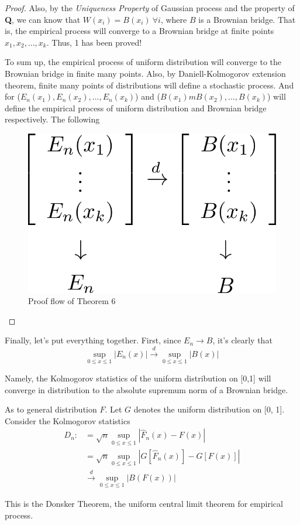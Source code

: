\documentclass[final_project_1.tex]{subfiles}
\begin{document}
\begin{proof}
Also, by the {\it Uniqueness Property} of Gaussian process and the property of {\bf Q}, we can know that $W(x_i)=B(x_i)\ \forall i$, where $B$ is a Brownian bridge. That is, the empirical process will converge to a Brownian bridge at finite points $x_1, x_2, ..., x_k$. Thus, 1 has been proved!

To sum up, the empirical process of uniform distribution will converge to the Brownian bridge in finite many points. Also, by Daniell-Kolmogorov extension theorem, finite many points of distributions will define a stochastic process. And for ($E_n(x_1), E_n(x_2), ..., E_n(x_k)$) and ($B(x_1)m B(x_2), ..., B(x_k)$) will define the empirical process of uniform distribution and Brownian bridge respectively. The following 
\begin{figure}[ht]
\includegraphics[scale=0.4]{donsker_1.png}
\caption{Proof flow of Theorem 6}
\end{figure}
\end{proof}

Finally, let's put everything together. First, since $E_n\rightarrow B$, it's clearly that
$$\sup_{0\leq x\leq 1}|E_n(x)|\xrightarrow{d}\sup_{0\leq x\leq 1}|B(x)|$$

Namely, the Kolmogorov statistics of the uniform distribution on [0,1] will converge in distribution to the absolute supremum norm of a Brownian bridge.

As to general distribution $F$. Let $G$ denotes the uniform distribution on [0, 1]. Consider the Kolmogorov statistics
\begin{align*}
D_n:&=\sqrt{n}\sup_{0\leq x\leq 1}|\hat{F}_n(x) - F(x)|\\
&=\sqrt{n}\sup_{0\leq x\leq 1}|G[\hat{F}_n(x)] - G[F(x)]|\\
&\xrightarrow{d}\sup_{0\leq x\leq 1}|B(F(x))|
\end{align*}

This is the Donsker Theorem, the uniform central limit theorem for empirical process.
\end{document}
